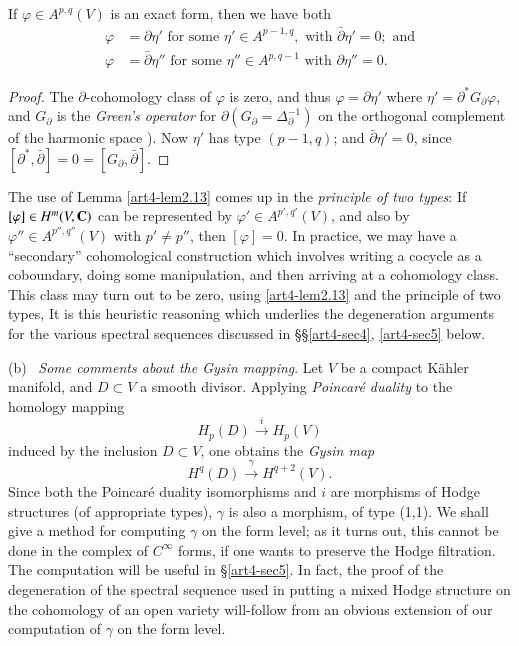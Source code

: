 \setcounter{lemma}{12}
\begin{lemma}\label{art4-lem2.13}
If $\varphi \in A^{p,q} (V)$ is an exact form, then we have both
\begin{align*}
\varphi & = \partial \eta' \text{ for some } \eta' \in A^{p-1,q}, \text{ with } \bar{\partial} \eta' = 0; \text{ and}\\
\varphi & = \bar{\partial} \eta'' \text{ for some } \eta'' \in A^{p,q-1} \text{ with } \partial \eta'' = 0.
\end{align*} 
\end{lemma}

\begin{proof}
The $\partial$-cohomology class of $\varphi$ is zero, and thus $\varphi = \partial \eta'$ where $\eta' = \partial^\ast G_\partial \varphi$, and $G_\partial$ is the \textit{Green's operator} for $\partial (G_\partial = \Delta^{-1}_{\partial})$ on the orthogonal complement of the harmonic space \cite{art4-key44}). Now $\eta'$ has type $(p-1, q)$; and $\bar{\partial} \eta' = 0$, since $[\partial^{\ast}, \bar{\partial}]  =0=[G_\partial, \bar{\partial}]$.
\end{proof}

The use of Lemma \ref{art4-lem2.13} comes up in the \textit{principle of two types}: If $[\varphi] \in H^m(V, \mathbf{C})$ can be represented by $\varphi' \in A^{p',q'} (V)$, and also by $\varphi'' \in A^{p'', q''} (V)$ with $p' \neq p''$, then $[\varphi] =0$. In practice, we may have a ``secondary'' cohomological construction which involves writing a cocycle as a coboundary, doing some manipulation, and then arriving at a cohomology class. This class may turn out to be zero, using \ref{art4-lem2.13} and the principle of two types, It is this heuristic reasoning which underlies the degeneration arguments for the various spectral sequences discussed in \S \S \ref{art4-sec4}, \ref{art4-sec5} below.

\medskip
\noindent
(b)~ \textit{Some comments about the Gysin mapping}. Let $V$ be a compact K\"{a}hler manifold, and $D \subset V$ a smooth divisor. Applying \textit{Poincar\'e duality} to the homology mapping
$$
H_p (D) \xrightarrow{i} H_p (V)
$$
induced by the inclusion $D \subset V$, one obtains the \textit{Gysin map}
\setcounter{equation}{13}
\begin{equation}
H^q (D) \xrightarrow{\gamma} H^{q+2}(V). \label{art4-eq2.14}
\end{equation}\pageoriginale
Since both the Poincar\'e duality isomorphisms and $i$ are morphisms of Hodge structures (of appropriate types), $\gamma$ is also a morphism, of type (1,1). We shall give a method for computing $\gamma$ on the form level; as it turns out, this cannot be done in the complex of $C^\infty$ forms, if one wants to preserve the Hodge filtration. The computation will be useful in \S \ref{art4-sec5}. In fact, the proof of the degeneration of the spectral sequence used in putting a mixed Hodge structure on the cohomology of an open variety will-follow from an obvious extension of our computation of $\gamma$ on the form level.

